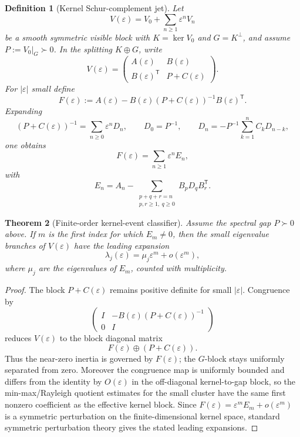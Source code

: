 \documentclass[11pt,a4paper]{article}
\numberwithin{equation}{section}
\theoremstyle{thmcompact}
\newtheorem{theorem}{Theorem}[section]
\newtheorem{definition}[theorem]{Definition}
\theoremstyle{remark}
\begin{document}
\begin{definition}[Kernel Schur-complement jet]
\label{def:kernel-jet}
Let
\[
V(\varepsilon)=V_0+\sum_{n\ge1}\varepsilon^n V_n
\]
be a smooth symmetric visible block with $K=\ker V_0$ and $G=K^\perp$, and assume $P:=V_0|_G\succ0$. In the splitting $K\oplus G$, write
\[
V(\varepsilon)=
\begin{pmatrix}
A(\varepsilon) & B(\varepsilon)\\
B(\varepsilon)^{\mathsf T} & P+C(\varepsilon)
\end{pmatrix}.
\]
For $|\varepsilon|$ small define
\begin{equation}
F(\varepsilon):=
A(\varepsilon)-B(\varepsilon)(P+C(\varepsilon))^{-1}B(\varepsilon)^{\mathsf T}.
\label{eq:kernel-F}
\end{equation}
Expanding
\[
(P+C(\varepsilon))^{-1}=\sum_{n\ge0}\varepsilon^nD_n,
\qquad
D_0=P^{-1},
\qquad
D_n=-P^{-1}\sum_{k=1}^n C_kD_{n-k},
\]
one obtains
\[
F(\varepsilon)=\sum_{n\ge1}\varepsilon^nE_n,
\]
with
\begin{equation}
E_n
=A_n-
\sum_{\substack{p+q+r=n\\ p,r\ge1,\ q\ge0}}
B_pD_qB_r^{\mathsf T}.
\label{eq:E-recursion}
\end{equation}
\end{definition}

\begin{theorem}[Finite-order kernel-event classifier]
\label{thm:kernel-event-classifier}
Assume the spectral gap $P\succ0$ above. If $m$ is the first index for which $E_m\neq0$, then the small eigenvalue branches of $V(\varepsilon)$ have the leading expansion
\[
\lambda_j(\varepsilon)=\mu_j\varepsilon^m+o(\varepsilon^m),
\]
where $\mu_j$ are the eigenvalues of $E_m$, counted with multiplicity.
\end{theorem}

\begin{proof}
The block $P+C(\varepsilon)$ remains positive definite for small $|\varepsilon|$. Congruence by
\[
\begin{pmatrix}
I & -B(\varepsilon)(P+C(\varepsilon))^{-1}\\
0 & I
\end{pmatrix}
\]
reduces $V(\varepsilon)$ to the block diagonal matrix
\[
F(\varepsilon)\oplus(P+C(\varepsilon)).
\]
Thus the near-zero inertia is governed by $F(\varepsilon)$; the $G$-block stays uniformly separated from zero. Moreover the congruence map is uniformly bounded and differs from the identity by $O(\varepsilon)$ in the off-diagonal kernel-to-gap block, so the min-max/Rayleigh quotient estimates for the small cluster have the same first nonzero coefficient as the effective kernel block. Since $F(\varepsilon)=\varepsilon^mE_m+o(\varepsilon^m)$ is a symmetric perturbation on the finite-dimensional kernel space, standard symmetric perturbation theory gives the stated leading expansions.
\end{proof}
\end{document}
